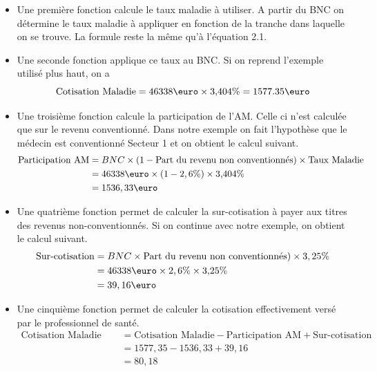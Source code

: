 \begin{itemize}
    \item Une première fonction calcule le taux maladie à utiliser. A partir du BNC on détermine le taux maladie à appliquer en fonction de la tranche dans laquelle on se trouve. La formule reste la même qu'à l'équation 2.1.

    \item Une seconde fonction applique ce taux au BNC. Si on reprend l'exemple utilisé plus haut, on a 
    \begin{equation}
    \text{Cotisation Maladie} = 46 338 \text{\euro} \times 3{,}404\% = 1577.35 \text{\euro}
    \end{equation}

    \item Une troisième fonction calcule la participation de l'AM. Celle ci n'est calculée que sur le revenu conventionné. Dans notre exemple on fait l'hypothèse que le médecin est conventionné Secteur 1 et on obtient le calcul suivant.
    \begin{align}
    \text{Participation AM} &= BNC \times (1 - \text{Part du revenu non conventionnés}) \times \text{Taux Maladie} \\
    &= 46 338 \text{\euro} \times (1 - 2,6\%) \times 3{,}404\% \\
    &= 1536,33 \text{\euro}
    \end{align}

    \item Une quatrième fonction permet de calculer la sur-cotisation à payer aux titres des revenus non-conventionnés. Si on continue avec notre exemple, on obtient le calcul suivant.
    \begin{align}
    \text{Sur-cotisation} &= BNC \times \text{Part du revenu non conventionnés}) \times 3,25\% \\
    &= 46 338 \text{\euro} \times 2,6\% \times 3{,}25\% \\
    &= 39,16 \text{\euro}
    \end{align}    

    \item Une cinquième fonction permet de calculer la cotisation effectivement versé par le professionnel de santé.
    \begin{align}
    \text{Cotisation Maladie Effective} &= \text{Cotisation Maladie} - \text{Participation AM} + \text{Sur-cotisation} \\
    &= 1577,35 - 1536,33 + 39,16 \\
    &= 80,18
    \end{align}
\end{itemize}

